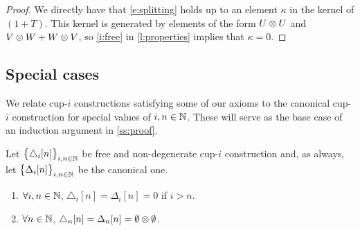 \begin{proof}
	We directly have that \eqref{e:splitting} holds up to an element $\kappa$ in the kernel of $(1+T)$.
	This kernel is generated by elements of the form $U \otimes U$ and $V \otimes W + W \otimes V$, so \cref{i:free} in \cref{l:properties} implies that $\kappa = 0$.
\end{proof}

\subsection{Special cases}\label{ss:cases}

We relate cup-$i$ constructions satisfying some of our axioms to the canonical cup-$i$ construction for special values of $i,n \in \mathbb{N}$.
These will serve as the base case of an induction argument in \cref{ss:proof}.

\begin{lemma}\label{l:special case one}
	Let $\big\{ \triangle_i [n] \big\}_{i,n\in\mathbb{N}}$ be free and non-degenerate \mbox{cup-$i$} construction and, as always, let $\big\{ \Delta_i [n] \big\}_{i,n\in\mathbb{N}}$ be the canonical one.
	\begin{enumerate}
		\item \label{i:i>n} $\forall i,n \in \mathbb{N}$, $\triangle_i[n] = \Delta_i [n] = 0$ if $i > n$.
		\item \label{i:i=n} $\forall n \in \mathbb{N}$, $\triangle_n[n] = \Delta_n [n] = \emptyset \otimes \emptyset$.
	\end{enumerate}
\end{lemma}


